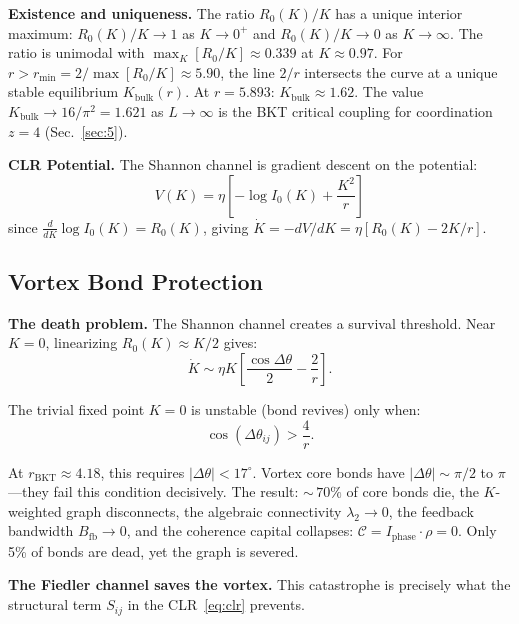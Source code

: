 \documentclass[aps,prd,onecolumn,superscriptaddress,floatfix,12pt]{revtex4-2}
\newcommand{\Rzero}{R_0}
\newcommand{\Kbulk}{K_{\text{bulk}}}
\newcommand{\Iphase}{I_{\text{phase}}}
\begin{document}
\textbf{Existence and uniqueness.} The ratio $\Rzero(K)/K$ has a unique interior maximum: $\Rzero(K)/K \to 1$ as $K \to 0^+$ and $\Rzero(K)/K \to 0$ as $K \to \infty$. The ratio is unimodal with $\max_K[\Rzero/K] \approx 0.339$ at $K \approx 0.97$. For $r > r_{\min} = 2/\max[\Rzero/K] \approx 5.90$, the line $2/r$ intersects the curve at a unique stable equilibrium $\Kbulk(r)$. At $r = 5.893$: $\Kbulk \approx 1.62$. The value $\Kbulk \to 16/\pi^2 = 1.621$ as $L \to \infty$ is the BKT critical coupling for coordination $z=4$ (Sec.~\ref{sec:5}).

\textbf{CLR Potential.} The Shannon channel is gradient descent on the potential:
\begin{equation}\label{eq:potential}
V(K) = \eta\left[-\log I_0(K) + \frac{K^2}{r}\right]
\end{equation}
since $\frac{d}{dK}\log I_0(K) = \Rzero(K)$, giving $\dot{K} = -dV/dK = \eta[\Rzero(K) - 2K/r]$.

\subsection{Vortex Bond Protection}\label{sec:2-3b}

\textbf{The death problem.} The Shannon channel creates a survival threshold. Near $K = 0$, linearizing $\Rzero(K) \approx K/2$ gives:
\begin{equation}\label{eq:death-threshold}
\dot{K} \sim \eta K\!\left[\frac{\cos\Delta\theta}{2} - \frac{2}{r}\right].
\end{equation}

The trivial fixed point $K = 0$ is unstable (bond revives) only when:
\begin{equation}\label{eq:survival}
\cos(\Delta\theta_{ij}) > \frac{4}{r}.
\end{equation}

At $r_{\text{BKT}} \approx 4.18$, this requires $|\Delta\theta| < 17^\circ$. Vortex core bonds have $|\Delta\theta| \sim \pi/2$ to $\pi$---they fail this condition decisively. The result: ${\sim}\,70\%$ of core bonds die, the $K$-weighted graph disconnects, the algebraic connectivity $\lambda_2 \to 0$, the feedback bandwidth $B_{\text{fb}} \to 0$, and the coherence capital collapses: $\mathcal{C} = \Iphase \cdot \rho = 0$. Only 5\% of bonds are dead, yet the graph is severed.

\textbf{The Fiedler channel saves the vortex.} This catastrophe is precisely what the structural term $S_{ij}$ in the CLR~\eqref{eq:clr} prevents.
\end{document}
